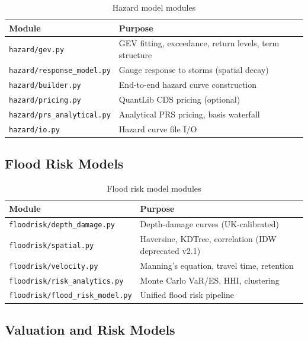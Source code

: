 \documentclass[11pt,a4paper]{article}
\begin{document}
\begin{table}[H]
    \centering
    \caption{Hazard model modules}
    \begin{tabular}{@{}ll@{}}
        \toprule
        \textbf{Module} & \textbf{Purpose} \\
        \midrule
        \texttt{hazard/gev.py}            & GEV fitting, exceedance, return levels, term structure \\
        \texttt{hazard/response\_model.py} & Gauge response to storms (spatial decay) \\
        \texttt{hazard/builder.py}         & End-to-end hazard curve construction \\
        \texttt{hazard/pricing.py}         & QuantLib CDS pricing (optional) \\
        \texttt{hazard/prs\_analytical.py}  & Analytical PRS pricing, basis waterfall \\
        \texttt{hazard/io.py}              & Hazard curve file I/O \\
        \bottomrule
    \end{tabular}
\end{table}

\subsection{Flood Risk Models}

\begin{table}[H]
    \centering
    \caption{Flood risk model modules}
    \begin{tabular}{@{}ll@{}}
        \toprule
        \textbf{Module} & \textbf{Purpose} \\
        \midrule
        \texttt{floodrisk/depth\_damage.py}   & Depth-damage curves (UK-calibrated) \\
        \texttt{floodrisk/spatial.py}          & Haversine, KDTree, correlation (IDW deprecated v2.1) \\
        \texttt{floodrisk/velocity.py}         & Manning's equation, travel time, retention \\
        \texttt{floodrisk/risk\_analytics.py}  & Monte Carlo VaR/ES, HHI, clustering \\
        \texttt{floodrisk/flood\_risk\_model.py}& Unified flood risk pipeline \\
        \bottomrule
    \end{tabular}
\end{table}

\subsection{Valuation and Risk Models}
\end{document}
